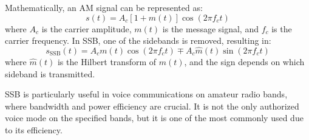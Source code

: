 Mathematically, an AM signal can be represented as:
\[
s(t) = A_c \left[1 + m(t)\right] \cos(2\pi f_c t)
\]
where \(A_c\) is the carrier amplitude, \(m(t)\) is the message signal, and \(f_c\) is the carrier frequency. In SSB, one of the sidebands is removed, resulting in:
\[
s_{\text{SSB}}(t) = A_c m(t) \cos(2\pi f_c t) \mp A_c \hat{m}(t) \sin(2\pi f_c t)
\]
where \(\hat{m}(t)\) is the Hilbert transform of \(m(t)\), and the sign depends on which sideband is transmitted.

SSB is particularly useful in voice communications on amateur radio bands, where bandwidth and power efficiency are crucial. It is not the only authorized voice mode on the specified bands, but it is one of the most commonly used due to its efficiency.

